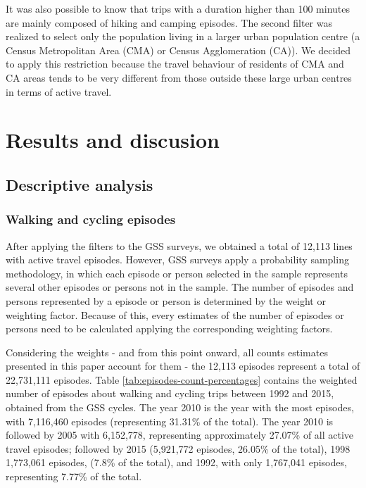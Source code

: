 \documentclass[preprint, 3p,
authoryear]{elsarticle} %
\begin{document}
It was also possible to know that trips with a duration higher than 100
minutes are mainly composed of hiking and camping episodes. The second
filter was realized to select only the population living in a larger
urban population centre (a Census Metropolitan Area (CMA) or Census
Agglomeration (CA)). We decided to apply this restriction because the
travel behaviour of residents of CMA and CA areas tends to be very
different from those outside these large urban centres in terms of
active travel.

\section{Results and discusion}\label{results-and-discusion}

\subsection{Descriptive analysis}\label{descriptive-analysis}

\subsubsection{Walking and cycling
episodes}\label{walking-and-cycling-episodes}

After applying the filters to the GSS surveys, we obtained a total of
12,113 lines with active travel episodes. However, GSS surveys apply a
probability sampling methodology, in which each episode or person
selected in the sample represents several other episodes or persons not
in the sample. The number of episodes and persons represented by a
episode or person is determined by the weight or weighting factor.
Because of this, every estimates of the number of episodes or persons
need to be calculated applying the corresponding weighting factors.

Considering the weights - and from this point onward, all counts
estimates presented in this paper account for them - the 12,113 episodes
represent a total of 22,731,111 episodes. Table
\ref{tab:episodes-count-percentages} contains the weighted number of
episodes about walking and cycling trips between 1992 and 2015, obtained
from the GSS cycles. The year 2010 is the year with the most episodes,
with 7,116,460 episodes (representing 31.31\% of the total). The year
2010 is followed by 2005 with 6,152,778, representing approximately
27.07\% of all active travel episodes; followed by 2015 (5,921,772
episodes, 26.05\% of the total), 1998 1,773,061 episodes, (7.8\% of the
total), and 1992, with only 1,767,041 episodes, representing 7.77\% of
the total.
\end{document}
